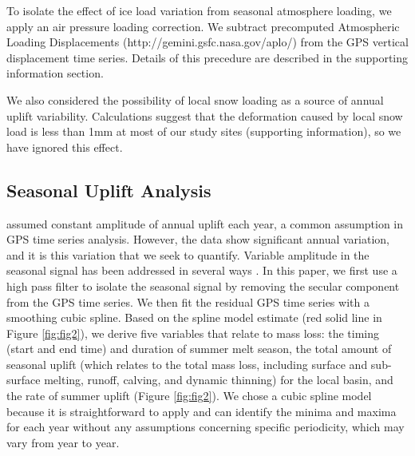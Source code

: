 To isolate the effect of ice load variation from seasonal atmosphere loading, we apply an air pressure loading correction.  We subtract precomputed Atmospheric Loading Displacements (http://gemini.gsfc.nasa.gov/aplo/) \cite[]{petrov2004study}from the GPS vertical displacement time series.  Details of this precedure are described in the supporting information section.  

We also considered the possibility of local snow loading as a source of annual uplift variability. Calculations suggest that the deformation caused by local snow load is less than 1mm at most of our study sites (supporting information), so we have ignored this effect.

\subsection{Seasonal Uplift Analysis}
\cite{jiang2010accelerating} assumed constant amplitude of annual uplift each year, a common assumption in GPS time series analysis. However, the data show significant annual variation, and it is this variation that we seek to quantify. Variable amplitude in the seasonal signal has been addressed in several ways \cite[]{murray2005spatiotemporal,davis2006subcontinental,bennett2008instantaneous,davis2012seasonal}. In this paper, we first use a high pass filter to isolate the seasonal signal by removing the secular component from the GPS time series. We then fit the residual GPS time series with a smoothing cubic spline. Based on the spline model estimate (red solid line in Figure \ref{fig:fig2}), we derive five variables that relate to mass loss: the timing (start and end time) and duration of summer melt season, the total amount of seasonal uplift (which relates to the total mass loss, including surface and sub-surface melting, runoff, calving, and dynamic thinning) for the local basin, and the rate of summer uplift (Figure \ref{fig:fig2}). We chose a cubic spline model because it is straightforward to apply and can identify the minima and maxima for each year without any assumptions concerning specific periodicity, which may vary from year to year. 

